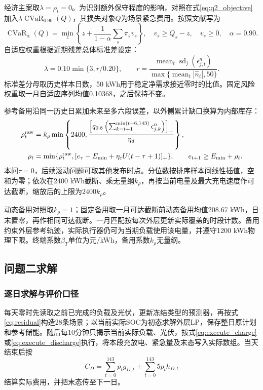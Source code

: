 经济主案取$\lambda=\rho_t=0$。为识别额外保守程度的影响，对照在式\eqref{eq:q2_objective}加入$\lambda\operatorname{CVaR}_{0.90}(Q)$，其损失对象$Q$为场景紧急费用。按照文献\cite{rockafellar2000}写为
\begin{equation}
 \operatorname{CVaR}_{\alpha}(Q)=
 \min_z\left\{z+\frac{1}{1-\alpha}\sum_s\pi_sv_s\right\},\quad
 v_s\ge Q_s-z,\quad v_s\ge0,\quad\alpha=0.90.
 \label{eq:cvar}
\end{equation}
自适应权重根据近期残差总体标准差设定：
\begin{equation}
 \lambda=0.10\min\{3,r/0.20\},\qquad
 r=\frac{\operatorname{mean}_t\operatorname{sd}_j(\epsilon^n_{j,t})}
 {\max\{\operatorname{mean}_t|\widehat n_t|,50\}}.
 \label{eq:risk_weight}
\end{equation}
标准差分母取历史样本日数，50 kWh用于稳定净需求接近零时的比值。固定风险权重取一月自适应序列均值0.10368，之后保持不变。

参考备用沿同一历史日累加未来至多六段误差，以外侧累计缺口换算为内部库存：
\begin{align}
 \rho_t^{\rm raw}
 &=k_\rho\min\left\{2400,
 \frac{\left[q_{0.8}\left(\sum_{k=t+1}^{\min(t+6,143)}
             \epsilon^n_{j,k}\right)\right]_+}{\eta_d}\right\},
 \label{eq:reserve}\\
 \rho_t&=\min\{\rho_t^{\rm raw},
 [e_\tau-E_{\min}+\eta_cU(t-\tau+1)]_+\},\qquad
 e_{t+1}\ge E_{\min}+\rho_t.
 \label{eq:reachable_reserve}
\end{align}
本问$\tau=0$，后续滚动问题可取其他发布时点。分位数按排序样本间线性插值，空和为零；依次在2400 kWh截断、乘无量纲$k_\rho$，再按当前电量及最大充电速度作可达截断，缩放后的上限为$2400k_\rho$。

动态备用对照取$k_\rho=1$；固定备用取一月可达截断前动态备用均值208.67 kWh，日末置零，再作相同可达截断。一月匹配按每次外层更新实际覆盖的时段计数。备用约束外层参考轨迹，实际执行器仍可为当期负载使用该电量，并遵守1200 kWh物理下限。终端系数$\beta_T$单位为元/kWh，备用系数$k_\rho$无量纲。

\subsection{问题二求解}

\subsubsection{逐日求解与评价口径}

每天零时先读取之前已完成的负载及光伏，更新冻结类型的预测器，再按式\eqref{eq:residual}构造28条场景；以当前实际SOC为初态求解外层LP，保存整日原计划和参考储能。随后每10分钟只揭示当前实际负载、光伏，按式\eqref{eq:execute_charge}或\eqref{eq:execute_discharge}执行，将本段充放电、紧急量及末态写入实际数组。当天结束后按
\begin{equation}
 C_D=\sum_{t=0}^{143}p_tg_{D,t}+\sum_{t=0}^{143}5p_th_{D,t}
 \label{eq:q2_actual_bill}
\end{equation}
结算实际费用，并把末态传至下一日。

